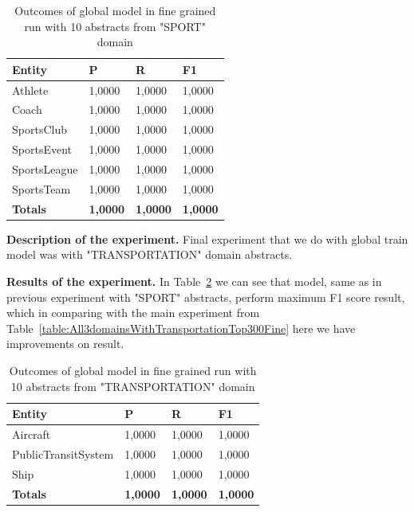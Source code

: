 \documentclass[thesis=M,english]{FITthesis}[2018/05/30]
\begin{document}
	\begin{table}[H]\centering
		\begin{tabular}{|l|l|l|l|}
			\hline {\textbf{Entity}} & {\textbf{P}} & {\textbf{R}} & {\textbf{F1}}\\\hline
				Athlete & 1,0000 & 1,0000 & 1,0000\\
				Coach & 1,0000 & 1,0000 & 1,0000\\
				SportsClub & 1,0000 & 1,0000 & 1,0000\\
				SportsEvent & 1,0000 & 1,0000 & 1,0000\\
				SportsLeague & 1,0000 & 1,0000 & 1,0000\\
				SportsTeam & 1,0000 & 1,0000 & 1,0000\\\hline
				\textbf{Totals} & \textbf{1,0000} & \textbf{1,0000} & \textbf{1,0000}\\\hline
		\end{tabular}
		\caption{Outcomes of global model in fine grained run with 10 abstracts from "SPORT" domain \label{table:GlobalDomainWithSportTop10Fine}}		
	\end{table}
	
	\textbf{Description of the experiment.} Final experiment that we do with global train model was with "TRANSPORTATION" domain abstracts. 
	
	\textbf{Results of the experiment.} In Table~\ref{table:GlobalDomainWithTransportationTop10Fine} we can see that model, same as in previous experiment with "SPORT" abstracts, perform maximum F1 score result, which in comparing with the main experiment from Table~\ref{table:All3domainsWithTransportationTop300Fine} here we have improvements on result.
	 
	\begin{table}[H]\centering
		\begin{tabular}{|l|l|l|l|}
			\hline {\textbf{Entity}} & {\textbf{P}} & {\textbf{R}} & {\textbf{F1}}\\\hline
				Aircraft & 1,0000 & 1,0000 & 1,0000\\
				PublicTransitSystem & 1,0000 & 1,0000 & 1,0000\\
				Ship & 1,0000 & 1,0000 & 1,0000\\\hline
				\textbf{Totals} & \textbf{1,0000} & \textbf{1,0000} & \textbf{1,0000}\\\hline
		\end{tabular}
		\caption{Outcomes of global model in fine grained run with 10 abstracts from "TRANSPORTATION" domain \label{table:GlobalDomainWithTransportationTop10Fine}}		
	\end{table}
	
\end{document}
